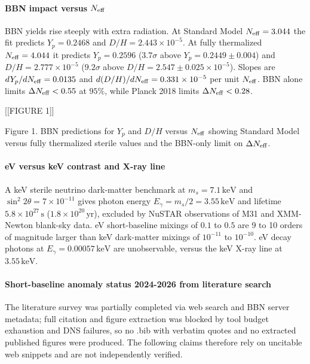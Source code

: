 \documentclass[11pt,a4paper]{article}
\begin{document}
\paragraph{BBN impact versus $N_{\rm eff}$}
BBN yields rise steeply with extra radiation. At Standard Model $N_{\rm eff} = 3.044$ the fit predicts $Y_p = 0.2468$ and $D/H = 2.443 \times 10^{-5}$. At fully thermalized $N_{\rm eff} = 4.044$ it predicts $Y_p = 0.2596$ ($3.7\sigma$ above $Y_p = 0.2449 \pm 0.004$) and $D/H = 2.777 \times 10^{-5}$ ($9.2\sigma$ above $D/H = 2.547 \pm 0.025 \times 10^{-5}$). Slopes are $dY_p/dN_{\rm eff} = 0.0135$ and $d(D/H)/dN_{\rm eff} = 0.331 \times 10^{-5}$ per unit $N_{\rm eff}$. BBN alone limits $\Delta N_{\rm eff} < 0.55$ at $95\%$, while Planck 2018 limits $\Delta N_{\rm eff} < 0.28$.


[[FIGURE 1]]

Figure 1. BBN predictions for $Y_p$ and $D/H$ versus $N_{\rm eff}$ showing Standard Model versus fully thermalized sterile values and the BBN-only limit on $\Delta N_{\rm eff}$.

\paragraph{eV versus keV contrast and X-ray line}
A keV sterile neutrino dark-matter benchmark at $m_s = 7.1\,\mathrm{keV}$ and $\sin^2 2\theta = 7 \times 10^{-11}$ gives photon energy $E_\gamma = m_s/2 = 3.55\,\mathrm{keV}$ and lifetime $5.8 \times 10^{27}\,\mathrm{s}$ ($1.8 \times 10^{20}\,\mathrm{yr}$), excluded by NuSTAR observations of M31 and XMM-Newton blank-sky data. eV short-baseline mixings of $0.1$ to $0.5$ are 9 to 10 orders of magnitude larger than keV dark-matter mixings of $10^{-11}$ to $10^{-10}$. eV decay photons at $E_\gamma = 0.00057\,\mathrm{keV}$ are unobservable, versus the keV X-ray line at $3.55\,\mathrm{keV}$.

\paragraph{Short-baseline anomaly status 2024-2026 from literature search}
The literature survey was partially completed via web search and BBN server metadata; full citation and figure extraction was blocked by tool budget exhaustion and DNS failures, so no .bib with verbatim quotes and no extracted published figures were produced. The following claims therefore rely on uncitable web snippets and are not independently verified.
\end{document}

